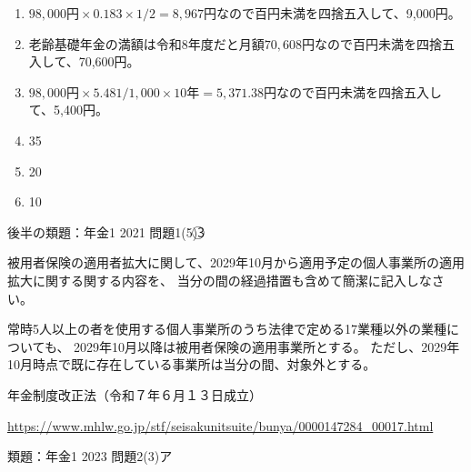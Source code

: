 \begin{answerbox}
  \begin{enumerate}[A: ]
    \item $98,000円 \times 0.183 \times 1/2 = 8,967円$なので百円未満を四捨五入して、9,000円。
    \item 老齢基礎年金の満額は令和8年度だと月額$70,608円$なので百円未満を四捨五入して、70,600円。
    \item $98,000円 \times 5.481/1,000 \times 10年 = 5,371.38円$なので百円未満を四捨五入して、5,400円。
    \item 35
    \item 20
    \item 10
  \end{enumerate}
\end{answerbox}

\begin{explanationbox}
  後半の類題：年金1 2021 問題1(5)\textcircled{3}
\end{explanationbox}

\begin{shortanswer}[自作 2026/11/1]
  被用者保険の適用者拡大に関して、2029年10月から適用予定の個人事業所の適用拡大に関する関する内容を、
  当分の間の経過措置も含めて簡潔に記入しなさい。
\end{shortanswer}

\begin{answerbox}
  常時5人以上の者を使用する個人事業所のうち法律で定める17業種以外の業種についても、
  2029年10月以降は被用者保険の適用事業所とする。
ただし、2029年10月時点で既に存在している事業所は当分の間、対象外とする。
\end{answerbox}

\begin{explanationbox}
  年金制度改正法（令和７年６月１３日成立）

  \url{https://www.mhlw.go.jp/stf/seisakunitsuite/bunya/0000147284_00017.html}

  \;

  類題：年金1 2023 問題2(3)ア
\end{explanationbox}

